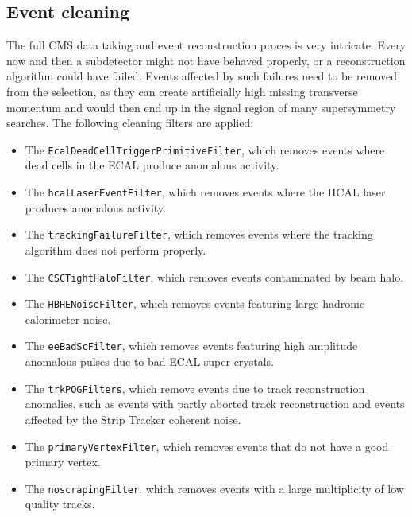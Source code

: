 



\subsection{Event cleaning \label{sec:event_cleaning}}

The full CMS data taking and event reconstruction proces is very intricate. Every now and then a
subdetector might not have behaved properly, or a reconstruction algorithm could have failed. 
Events affected by such failures need to be removed from the selection, as they can create
artificially high missing transverse momentum and would then end up in the signal region of many
supersymmetry searches. 
The following cleaning filters are applied:

\begin{itemize}
\item The {\tt EcalDeadCellTriggerPrimitiveFilter}, which removes events where dead cells in the
ECAL produce anomalous activity.
\item The {\tt hcalLaserEventFilter}, which removes events where the HCAL laser produces anomalous
activity.
\item The {\tt trackingFailureFilter}, which removes events where the tracking algorithm does not
perform properly.
\item The {\tt CSCTightHaloFilter}, which removes events contaminated by beam halo.
\item The {\tt HBHENoiseFilter}, which removes events featuring large hadronic calorimeter noise.
\item The {\tt eeBadScFilter}, which removes events featuring high amplitude anomalous pulses due
to bad ECAL super-crystals.
\item The {\tt trkPOGFilters}, which remove events due to track reconstruction anomalies, such as
events with partly aborted track reconstruction and events affected by the Strip Tracker coherent
noise.
\item The {\tt primaryVertexFilter}, which removes events that do not have a good primary vertex.
\item The {\tt noscrapingFilter}, which removes events with a large multiplicity of low quality
tracks.
\end{itemize}


